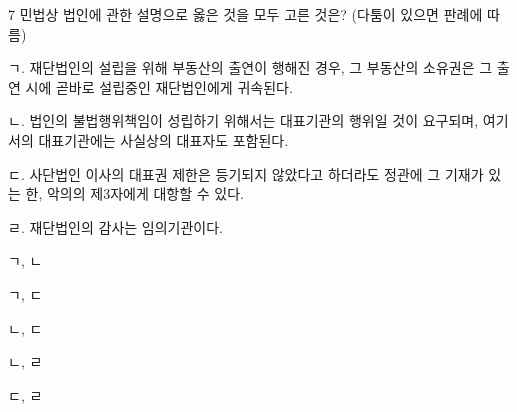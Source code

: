 \begin{question}{7}
민법상 법인에 관한 설명으로 옳은 것을 모두 고른 것은? (다툼이 있으면 판례에 따름)
\begin{framedtext}
ㄱ. 재단법인의 설립을 위해 부동산의 출연이 행해진 경우, 그 부동산의 소유권은 그 출연 시에 곧바로 설립중인 재단법인에게 귀속된다. \par
ㄴ. 법인의 불법행위책임이 성립하기 위해서는 대표기관의 행위일 것이 요구되며, 여기서의 대표기관에는 사실상의 대표자도 포함된다. \par
ㄷ. 사단법인 이사의 대표권 제한은 등기되지 않았다고 하더라도 정관에 그 기재가 있는 한, 악의의 제3자에게 대항할 수 있다. \par
ㄹ. 재단법인의 감사는 임의기관이다.
\end{framedtext}
\begin{choices}
  \item ㄱ, ㄴ
  \item ㄱ, ㄷ
  \item ㄴ, ㄷ
  \item ㄴ, ㄹ
  \item ㄷ, ㄹ
\end{choices}
\end{question}
